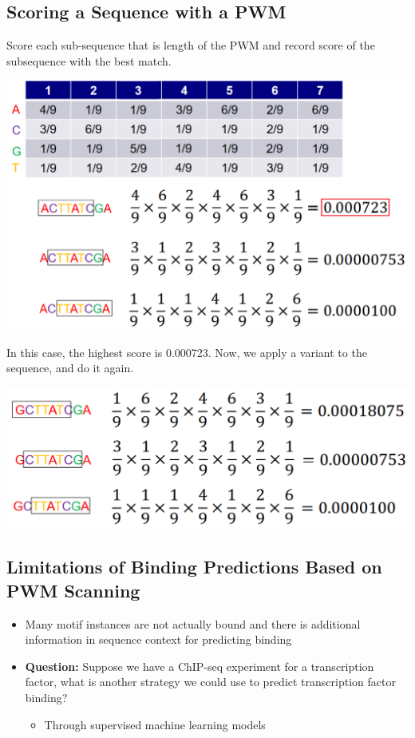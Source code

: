 \documentclass[10pt]{article}
\begin{document}
\subsection*{Scoring a Sequence with a PWM}
Score each sub-sequence that is length of the PWM and record score of the subsequence with the best match.
\begin{center} 
	\includegraphics*[width=\textwidth]{W8_4.png} 
\end{center}
In this case, the highest score is 0.000723.  Now, we apply a variant to the sequence, and do it again.
\begin{center} 
	\includegraphics*[width=\textwidth]{W8_5.png} 
\end{center}

\subsection*{Limitations of Binding Predictions Based on PWM Scanning}
\begin{itemize}
	\item Many motif instances are not actually bound and there is additional information in sequence context for predicting binding
	\item \textbf{Question:} Suppose we have a ChIP-seq experiment for a transcription factor, what is another strategy we could use to predict transcription factor binding?
	\begin{itemize}
        \item Through supervised machine learning models
    \end{itemize}
\end{itemize}
\end{document}
